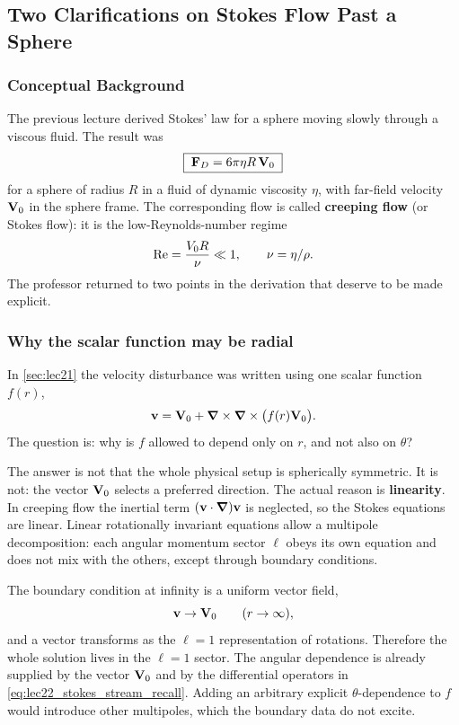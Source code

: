 \documentclass[../main.tex]{subfiles}
\begin{document}
\subsection{Two Clarifications on Stokes Flow Past a Sphere}\label{sec:lec22:stokes-clarifications}

\subsubsection*{Conceptual Background}
The previous lecture derived Stokes' law for a sphere moving slowly through a
viscous fluid. The result was
\begin{equation}
  \boxed{\;\mathbf{F}_D=6\pi\eta R\,\mathbf{V}_0\;}
  \label{eq:lec22_stokes_drag_recall}
\end{equation}
for a sphere of radius $R$ in a fluid of dynamic viscosity $\eta$, with far-field
velocity $\mathbf{V}_0$ in the sphere frame. The corresponding flow is called
\textbf{creeping flow} (or Stokes flow): it is the low-Reynolds-number regime
\[
  \mathrm{Re}=\frac{V_0R}{\nu}\ll1,\qquad \nu=\eta/\rho.
\]
The professor returned to two points in the derivation that deserve to be made
explicit.

\subsubsection*{Why the scalar function may be radial}
In \cref{sec:lec21} the velocity disturbance was written using one scalar
function $f(r)$,
\begin{equation}
  \mathbf{v}=\mathbf{V}_0+\grad\times\grad\times\big(f(r)\mathbf{V}_0\big).
  \label{eq:lec22_stokes_stream_recall}
\end{equation}
The question is: why is $f$ allowed to depend only on $r$, and not also on
$\theta$?

The answer is not that the whole physical setup is spherically symmetric. It is
not: the vector $\mathbf{V}_0$ selects a preferred direction. The actual reason is
\textbf{linearity}. In creeping flow the inertial term
$(\mathbf{v}\cdot\grad)\mathbf{v}$ is neglected, so the Stokes equations are linear. Linear
rotationally invariant equations allow a multipole decomposition: each angular
momentum sector $\ell$ obeys its own equation and does not mix with the others,
except through boundary conditions.

The boundary condition at infinity is a uniform vector field,
\[
  \mathbf{v}\to\mathbf{V}_0\qquad(r\to\infty),
\]
and a vector transforms as the $\ell=1$ representation of rotations. Therefore
the whole solution lives in the $\ell=1$ sector. The angular dependence is
already supplied by the vector $\mathbf{V}_0$ and by the differential operators in
\eqref{eq:lec22_stokes_stream_recall}. Adding an arbitrary explicit
$\theta$-dependence to $f$ would introduce other multipoles, which the boundary
data do not excite.
\end{document}
